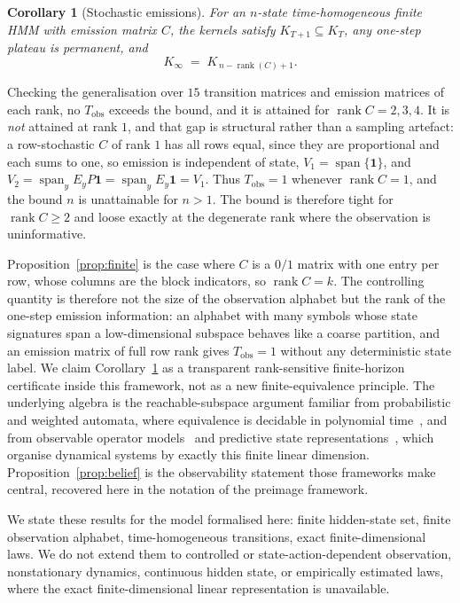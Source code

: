 \documentclass[11pt]{article}
\newtheorem{corollary}[proposition]{Corollary}
\begin{document}
\begin{corollary}[Stochastic emissions]\label{cor:stoch}
For an $n$-state time-homogeneous finite HMM with emission matrix $C$, the kernels satisfy
$K_{T+1} \subseteq K_T$, any one-step plateau is permanent, and
\[
  K_\infty \;=\; K_{\,n - \operatorname{rank}(C) + 1}.
\]
\end{corollary}

Checking the generalisation over $15$ transition matrices and emission matrices of each
rank, no $T_{\mathrm{obs}}$ exceeds the bound, and it is attained for
$\operatorname{rank} C = 2, 3, 4$. It is \emph{not} attained at rank $1$, and that gap is
structural rather than a sampling artefact: a row-stochastic $C$ of rank $1$ has all rows
equal, since they are proportional and each sums to one, so emission is independent of
state, $V_1 = \operatorname{span}\{\mathbf{1}\}$, and
$V_2 = \operatorname{span}_y E_y P \mathbf{1} = \operatorname{span}_y E_y \mathbf{1} = V_1$.
Thus $T_{\mathrm{obs}} = 1$ whenever $\operatorname{rank} C = 1$, and the bound $n$ is
unattainable for $n > 1$. The bound is therefore tight for $\operatorname{rank} C \ge 2$
and loose exactly at the degenerate rank where the observation is uninformative.

Proposition~\ref{prop:finite} is the case where $C$ is a $0/1$ matrix with one entry per
row, whose columns are the block indicators, so $\operatorname{rank} C = k$. The controlling
quantity is therefore not the size of the observation alphabet but the rank of the one-step
emission information: an alphabet with many symbols whose state signatures span a
low-dimensional subspace behaves like a coarse partition, and an emission matrix of full row
rank gives $T_{\mathrm{obs}} = 1$ without any deterministic state label. We claim Corollary~\ref{cor:stoch} as a transparent rank-sensitive
finite-horizon certificate inside this framework, not as a new finite-equivalence
principle. The underlying algebra is the reachable-subspace argument familiar from
probabilistic and weighted automata, where equivalence is decidable in polynomial
time~\cite{tzeng1992}, and from observable operator models~\cite{jaeger2000} and predictive
state representations~\cite{littman2001}, which organise dynamical systems by exactly this
finite linear dimension. Proposition~\ref{prop:belief} is the observability statement those
frameworks make central, recovered here in the notation of the preimage framework.

We state these results for the model formalised here: finite hidden-state set, finite
observation alphabet, time-homogeneous transitions, exact finite-dimensional laws. We do
not extend them to controlled or state-action-dependent observation, nonstationary
dynamics, continuous hidden state, or empirically estimated laws, where the exact
finite-dimensional linear representation is unavailable.
\end{document}
